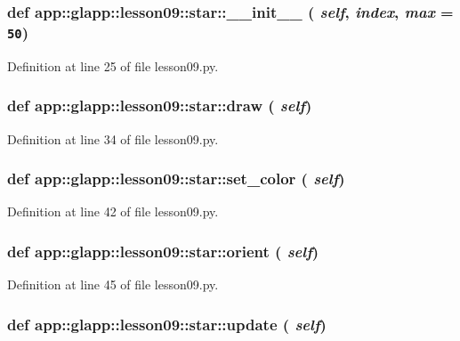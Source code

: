 \subsubsection{\setlength{\rightskip}{0pt plus 5cm}def app::glapp::lesson09::star::\_\-\_\-init\_\-\_\- ( {\em self},  {\em index},  {\em max} = {\tt 50})}\label{classapp_1_1glapp_1_1lesson09_1_1star_c097bc028e6ad9d449e85c0084ef6898}




Definition at line 25 of file lesson09.py.
\subsubsection{\setlength{\rightskip}{0pt plus 5cm}def app::glapp::lesson09::star::draw ( {\em self})}\label{classapp_1_1glapp_1_1lesson09_1_1star_9cdf39b8473e76ecd8dacbe5b7b264b5}




Definition at line 34 of file lesson09.py.
\subsubsection{\setlength{\rightskip}{0pt plus 5cm}def app::glapp::lesson09::star::set\_\-color ( {\em self})}\label{classapp_1_1glapp_1_1lesson09_1_1star_66eabf06aee495f17aaafe385a575ae4}




Definition at line 42 of file lesson09.py.
\subsubsection{\setlength{\rightskip}{0pt plus 5cm}def app::glapp::lesson09::star::orient ( {\em self})}\label{classapp_1_1glapp_1_1lesson09_1_1star_d3168ff9cf162ef1dde0811341783a04}




Definition at line 45 of file lesson09.py.
\subsubsection{\setlength{\rightskip}{0pt plus 5cm}def app::glapp::lesson09::star::update ( {\em self})}\label{classapp_1_1glapp_1_1lesson09_1_1star_9c83898af535cb21a01099eaa45ea03a}




